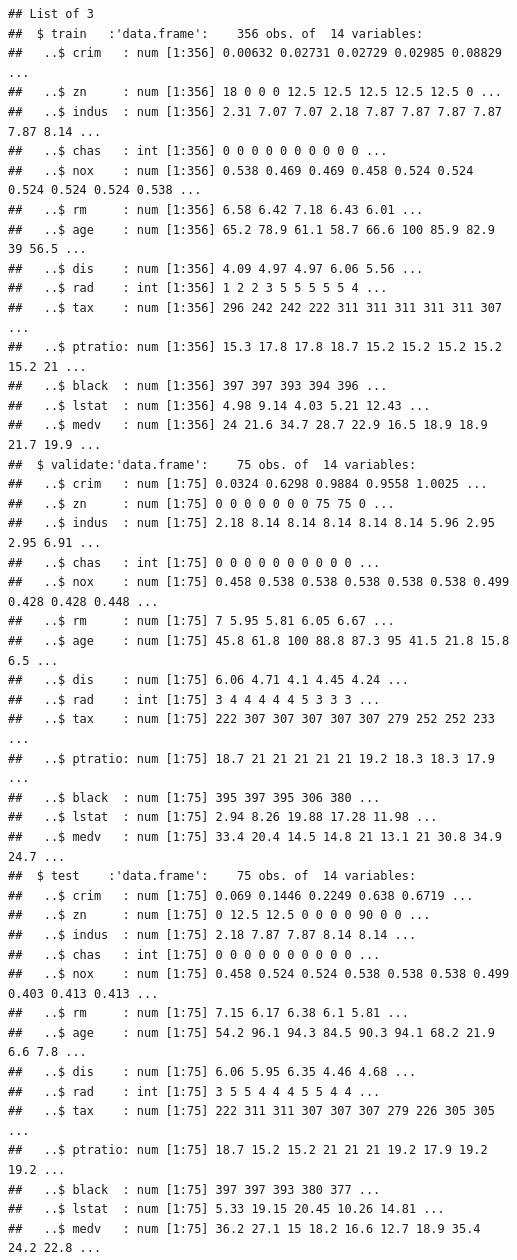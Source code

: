 \documentclass[
]{book}
\theoremstyle{break}
\theoremstyle{definition}
\theoremstyle{definition}
\theoremstyle{definition}
\theoremstyle{remark}
\begin{document}
\begin{verbatim}
## List of 3
##  $ train   :'data.frame':    356 obs. of  14 variables:
##   ..$ crim   : num [1:356] 0.00632 0.02731 0.02729 0.02985 0.08829 ...
##   ..$ zn     : num [1:356] 18 0 0 0 12.5 12.5 12.5 12.5 12.5 0 ...
##   ..$ indus  : num [1:356] 2.31 7.07 7.07 2.18 7.87 7.87 7.87 7.87 7.87 8.14 ...
##   ..$ chas   : int [1:356] 0 0 0 0 0 0 0 0 0 0 ...
##   ..$ nox    : num [1:356] 0.538 0.469 0.469 0.458 0.524 0.524 0.524 0.524 0.524 0.538 ...
##   ..$ rm     : num [1:356] 6.58 6.42 7.18 6.43 6.01 ...
##   ..$ age    : num [1:356] 65.2 78.9 61.1 58.7 66.6 100 85.9 82.9 39 56.5 ...
##   ..$ dis    : num [1:356] 4.09 4.97 4.97 6.06 5.56 ...
##   ..$ rad    : int [1:356] 1 2 2 3 5 5 5 5 5 4 ...
##   ..$ tax    : num [1:356] 296 242 242 222 311 311 311 311 311 307 ...
##   ..$ ptratio: num [1:356] 15.3 17.8 17.8 18.7 15.2 15.2 15.2 15.2 15.2 21 ...
##   ..$ black  : num [1:356] 397 397 393 394 396 ...
##   ..$ lstat  : num [1:356] 4.98 9.14 4.03 5.21 12.43 ...
##   ..$ medv   : num [1:356] 24 21.6 34.7 28.7 22.9 16.5 18.9 18.9 21.7 19.9 ...
##  $ validate:'data.frame':    75 obs. of  14 variables:
##   ..$ crim   : num [1:75] 0.0324 0.6298 0.9884 0.9558 1.0025 ...
##   ..$ zn     : num [1:75] 0 0 0 0 0 0 0 75 75 0 ...
##   ..$ indus  : num [1:75] 2.18 8.14 8.14 8.14 8.14 8.14 5.96 2.95 2.95 6.91 ...
##   ..$ chas   : int [1:75] 0 0 0 0 0 0 0 0 0 0 ...
##   ..$ nox    : num [1:75] 0.458 0.538 0.538 0.538 0.538 0.538 0.499 0.428 0.428 0.448 ...
##   ..$ rm     : num [1:75] 7 5.95 5.81 6.05 6.67 ...
##   ..$ age    : num [1:75] 45.8 61.8 100 88.8 87.3 95 41.5 21.8 15.8 6.5 ...
##   ..$ dis    : num [1:75] 6.06 4.71 4.1 4.45 4.24 ...
##   ..$ rad    : int [1:75] 3 4 4 4 4 4 5 3 3 3 ...
##   ..$ tax    : num [1:75] 222 307 307 307 307 307 279 252 252 233 ...
##   ..$ ptratio: num [1:75] 18.7 21 21 21 21 21 19.2 18.3 18.3 17.9 ...
##   ..$ black  : num [1:75] 395 397 395 306 380 ...
##   ..$ lstat  : num [1:75] 2.94 8.26 19.88 17.28 11.98 ...
##   ..$ medv   : num [1:75] 33.4 20.4 14.5 14.8 21 13.1 21 30.8 34.9 24.7 ...
##  $ test    :'data.frame':    75 obs. of  14 variables:
##   ..$ crim   : num [1:75] 0.069 0.1446 0.2249 0.638 0.6719 ...
##   ..$ zn     : num [1:75] 0 12.5 12.5 0 0 0 0 90 0 0 ...
##   ..$ indus  : num [1:75] 2.18 7.87 7.87 8.14 8.14 ...
##   ..$ chas   : int [1:75] 0 0 0 0 0 0 0 0 0 0 ...
##   ..$ nox    : num [1:75] 0.458 0.524 0.524 0.538 0.538 0.538 0.499 0.403 0.413 0.413 ...
##   ..$ rm     : num [1:75] 7.15 6.17 6.38 6.1 5.81 ...
##   ..$ age    : num [1:75] 54.2 96.1 94.3 84.5 90.3 94.1 68.2 21.9 6.6 7.8 ...
##   ..$ dis    : num [1:75] 6.06 5.95 6.35 4.46 4.68 ...
##   ..$ rad    : int [1:75] 3 5 5 4 4 4 5 5 4 4 ...
##   ..$ tax    : num [1:75] 222 311 311 307 307 307 279 226 305 305 ...
##   ..$ ptratio: num [1:75] 18.7 15.2 15.2 21 21 21 19.2 17.9 19.2 19.2 ...
##   ..$ black  : num [1:75] 397 397 393 380 377 ...
##   ..$ lstat  : num [1:75] 5.33 19.15 20.45 10.26 14.81 ...
##   ..$ medv   : num [1:75] 36.2 27.1 15 18.2 16.6 12.7 18.9 35.4 24.2 22.8 ...
\end{verbatim}
\end{document}
